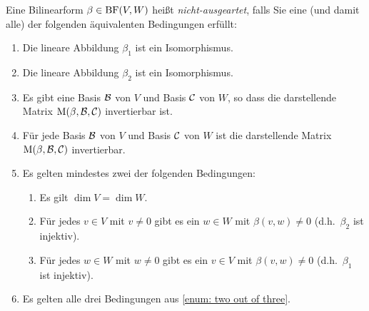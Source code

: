 \begin{definition}
  Eine Bilinearform $\beta \in \operatorname{BF}(V,W)$ heißt \emph{nicht-ausgeartet}, falls Sie eine \textup(und damit alle\textup) der folgenden äquivalenten Bedingungen erfüllt:
  \begin{enumerate}
    \item
      Die lineare Abbildung $\beta_1$ ist ein Isomorphismus.
    \item
      Die lineare Abbildung $\beta_2$ ist ein Isomorphismus.
    \item
      Es gibt eine Basis $\mathcal{B}$ von $V$ und Basis $\mathcal{C}$ von $W$, so dass die darstellende Matrix $\operatorname{M}(\beta, \mathcal{B}, \mathcal{C})$ invertierbar ist.
    \item
      Für jede Basis $\mathcal{B}$ von $V$ und Basis $\mathcal{C}$ von $W$ ist die darstellende Matrix $\operatorname{M}(\beta, \mathcal{B}, \mathcal{C})$ invertierbar.
    \item
      \label{enum: two out of three}
      Es gelten mindestes zwei der folgenden Bedingungen:
      \begin{enumerate}
        \item
          Es gilt $\dim V = \dim W$.
        \item
          Für jedes $v \in V$ mit $v \neq 0$ gibt es ein $w \in W$ mit $\beta(v,w) \neq 0$ \textup(d.h.\ $\beta_2$ ist injektiv\textup).
        \item
          Für jedes $w \in W$ mit $w \neq 0$ gibt es ein $v \in V$ mit $\beta(v,w) \neq 0$ \textup(d.h.\ $\beta_1$ ist injektiv\textup).
      \end{enumerate}
    \item
      Es gelten alle drei Bedingungen aus \ref{enum: two out of three}.
  \end{enumerate}
\end{definition}


